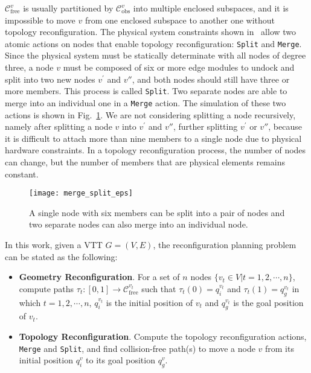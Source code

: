 \documentclass[journal]{IEEEtran}
\begin{document}
$\mathcal{C}_{\mathrm{free}}^v$ is usually partitioned by
$\mathcal{C}_{\mathrm{obs}}^v$ into multiple enclosed subspaces, and
it is impossible to move $v$ from one enclosed subspace to another one
without topology reconfiguration. The physical system constraints
shown in~\cite{Spinos-vtt-iros-2017} allow two atomic actions on nodes
that enable topology reconfiguration: \texttt{Split} and
\texttt{Merge}. Since the physical system must be statically
determinate with all nodes of degree three, a node $v$ must be
composed of six or more edge modules to undock and split into two new
nodes $v^\prime$ and $v''$, and both nodes should still have three or
more members. This process is called \texttt{Split}. Two separate
nodes are able to merge into an individual one in a \texttt{Merge}
action. The simulation of these two actions is shown in
Fig.~\ref{fig:merge-split}. We are not considering splitting a node
recursively, namely after splitting a node $v$ into $v^{\prime}$ and
$v''$, further splitting $v^{\prime}$ or $v''$, because it is
difficult to attach more than nine members to a single node due to
physical hardware constraints. In a topology reconfiguration process,
the number of nodes can change, but the number of members that are
physical elements remains constant.

\begin{figure}[t]
  \centering
  \texttt{[image: merge\_split\_eps]}
  \caption{A single node with six members can be split into a pair of nodes and two separate nodes can also merge into an individual node.}
  \label{fig:merge-split}
\end{figure}

In this work, given a VTT $G = (V,E)$, the reconfiguration planning
problem can be stated as the following:
\begin{itemize}
\item \textbf{Geometry Reconfiguration}. For a set of $n$ nodes
  $\{v_t\in V\vert t = 1,2,\cdots,n\}$, compute paths
  $\tau_t:\left[0, 1\right]\to \mathcal{C}_{\mathrm{free}}^{v_t}$ such
  that $\tau_t(0) = q_i^{v_t}$ and $\tau_t(1) = q_g^{v_t}$ in which
  $t=1,2,\cdots, n$, $q_i^{v_t}$ is the initial position of $v_t$ and
  $q_g^{v_t}$ is the goal position of $v_t$.
\item \textbf{Topology Reconfiguration}. Compute the topology
  reconfiguration actions, \texttt{Merge} and \texttt{Split}, and find
  collision-free path(s) to move a node $v$ from its initial position
  $q_i^v$ to its goal position $q_g^v$.
\end{itemize}
\end{document}

